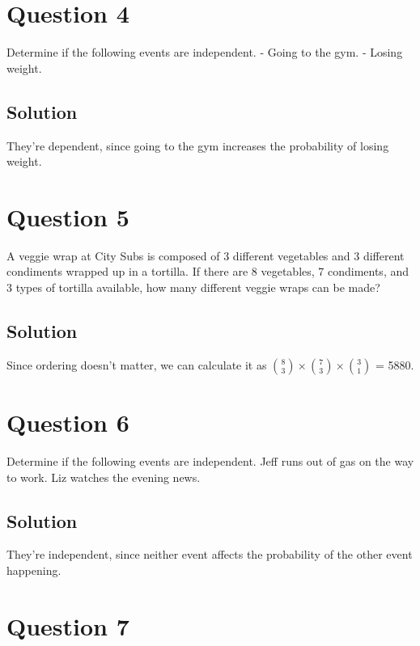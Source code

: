 \documentclass[]{article}
\begin{document}
\section{Question 4}\label{question-4}

Determine if the following events are independent. - Going to the gym. -
Losing weight.

\subsection{Solution}\label{solution-3}

They're dependent, since going to the gym increases the probability of
losing weight.

\section{Question 5}\label{question-5}

A veggie wrap at City Subs is composed of 3 different vegetables and 3
different condiments wrapped up in a tortilla. If there are 8
vegetables, 7 condiments, and 3 types of tortilla available, how many
different veggie wraps can be made?

\subsection{Solution}\label{solution-4}

Since ordering doesn't matter, we can calculate it as
\(\binom{8}{3}\times\binom{7}{3}\times\binom{3}{1}\) = 5880.

\section{Question 6}\label{question-6}

Determine if the following events are independent. Jeff runs out of gas
on the way to work. Liz watches the evening news.

\subsection{Solution}\label{solution-5}

They're independent, since neither event affects the probability of the
other event happening.

\section{Question 7}\label{question-7}
\end{document}
